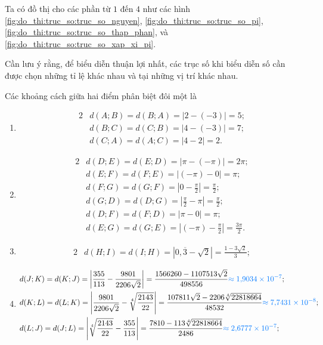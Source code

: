 Ta có đồ thị cho các phần từ $1$ đến $4$ như các hình \ref{fig:do_thi:truc_so:truc_so_nguyen}, \ref{fig:do_thi:truc_so:truc_so_pi}, \ref{fig:do_thi:truc_so:truc_so_thap_phan}, và \ref{fig:do_thi:truc_so:truc_so_xap_xi_pi}.

Cần lưu ý rằng, để biểu diễn thuận lợi nhất, các trục số khi biểu diễn số cần được chọn những tỉ lệ khác nhau và tại những vị trí khác nhau.

Các khoảng cách giữa hai điểm phân biệt đôi một là
\begin{enumerate}
   \item \begin{alignat*}{2}
      &d(A;B) = d(B;A) = \left|2 - (-3)\right| = 5; \\
      &d(B;C) = d(C;B) = \left|4 - (-3)\right| = 7; \\
      &d(C;A) = d(A;C) = \left|4 - 2\right| = 2.
   \end{alignat*}
   \item \begin{alignat*}{2}
      &d(D;E) = d(E;D) = \left|\pi - (-\pi)\right| = 2\pi; \\
      &d(E;F) = d(F;E) = \left|(-\pi) - 0\right| = \pi; \\
      &d(F;G) = d(G;F) = \left|0 - \frac{\pi}{2}\right| = \frac{\pi}{2}; \\
      &d(G;D) = d(D;G) = \left|\frac{\pi}{2} - \pi\right| = \frac{\pi}{2}; \\
      &d(D;F) = d(F;D) = \left|\pi - 0\right| = \pi;\\
      &d(E;G) = d(G;E) = \left|(-\pi) - \frac{\pi}{2}\right| = \frac{3\pi}{2}.
   \end{alignat*}
   \item \begin{alignat*}{2}
      &d(H;I) = d(I;H) = \left|0{,}\overline{3} - \sqrt{2}\right| = \frac{1-3\sqrt{2}}{3};
   \end{alignat*}
   \item \begin{alignat*}{2}
      &d(J;K) = d(K;J) = \left|\frac{355}{113} - \frac{9801}{2206\sqrt{2}}\right| = \frac{1566260-1107513\sqrt{2}}{498556} \textcolor{colorEmphasisCyan}{\approx 1{,}9034\times 10^{-7}}; \\
      &d(K;L) = d(L;K) = \left|\frac{9801}{2206\sqrt{2}} - \sqrt[4]{\frac{2143}{22}}\right| = \frac{107811\sqrt{2}-2206\sqrt[4]{22818664}}{48532} \textcolor{colorEmphasisCyan}{\approx 7{,}7431\times 10^{-8}}; \\
      &d(L;J) = d(J;L) = \left|\sqrt[4]{\frac{2143}{22}} - \frac{355}{113}\right| = \frac{7810-113\sqrt[4]{22818664}}{2486} \textcolor{colorEmphasisCyan}{\approx 2{,}6777\times 10^{-7}};
   \end{alignat*}
\end{enumerate}

